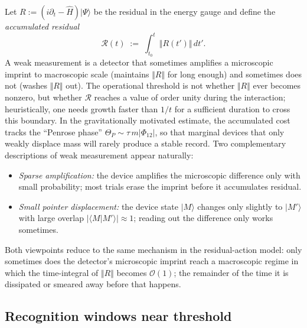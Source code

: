 \documentclass[11pt,letterpaper]{article}
\theoremstyle{definition}
\begin{document}
Let $R:=(i\partial_t-\hat H)|\Psi\rangle$ be the residual in the energy gauge and define the \emph{accumulated residual}
\begin{equation}
\mathcal R(t)\;:=\;\int_{t_0}^{t}\!\Vert R(t')\Vert\,dt'.
\end{equation}
A weak measurement is a detector that sometimes amplifies a microscopic imprint to macroscopic scale (maintains $\Vert R\Vert$ for long enough) and sometimes does not (washes $\Vert R\Vert$ out). The operational threshold is not whether $\Vert R\Vert$ ever becomes nonzero, but whether $\mathcal R$ reaches a value of order unity during the interaction; heuristically, one needs growth faster than $1/t$ for a sufficient duration to cross this boundary. In the gravitationally motivated estimate, the accumulated cost tracks the ``Penrose phase'' $\Theta_P\sim \tau\,m\vert\Phi_{12}\vert$, so that marginal devices that only weakly displace mass will rarely produce a stable record.
Two complementary descriptions of weak measurement appear naturally:
\begin{itemize}
\item \emph{Sparse amplification:} the device amplifies the microscopic difference only with small probability; most trials erase the imprint before it accumulates residual.
\item \emph{Small pointer displacement:} the device state $\lvert M\rangle$ changes only slightly to $\lvert M'\rangle$ with large overlap $\vert\langle M\vert M'\rangle\vert\approx 1$; reading out the difference only works sometimes.
\end{itemize}
Both viewpoints reduce to the same mechanism in the residual-action model: only sometimes does the detector's microscopic imprint reach a macroscopic regime in which the time-integral of $\Vert R\Vert$ becomes $\mathcal O(1)$; the remainder of the time it is dissipated or smeared away before that happens.
\subsection{Recognition windows near threshold}
\end{document}
